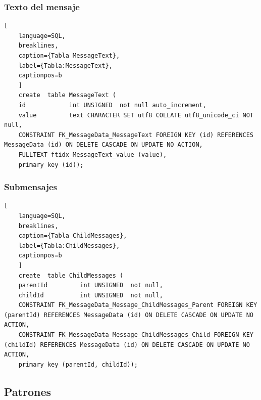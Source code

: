 \subsubsection{Texto del mensaje}
\begin{lstlisting}[
    language=SQL,
    breaklines, 
    caption={Tabla MessageText}, 
    label={Tabla:MessageText}, 
    captionpos=b
    ]
    create  table MessageText (
    id            int UNSIGNED  not null auto_increment, 
    value         text CHARACTER SET utf8 COLLATE utf8_unicode_ci NOT null, 
    CONSTRAINT FK_MessageData_MessageText FOREIGN KEY (id) REFERENCES MessageData (id) ON DELETE CASCADE ON UPDATE NO ACTION,
    FULLTEXT ftidx_MessageText_value (value),
    primary key (id));
\end{lstlisting}

\subsubsection{Submensajes}
\begin{lstlisting}[
    language=SQL,
    breaklines, 
    caption={Tabla ChildMessages}, 
    label={Tabla:ChildMessages}, 
    captionpos=b
    ]
    create  table ChildMessages (
    parentId         int UNSIGNED  not null, 
    childId          int UNSIGNED  not null, 
    CONSTRAINT FK_MessageData_Message_ChildMessages_Parent FOREIGN KEY (parentId) REFERENCES MessageData (id) ON DELETE CASCADE ON UPDATE NO ACTION,
    CONSTRAINT FK_MessageData_Message_ChildMessages_Child FOREIGN KEY (childId) REFERENCES MessageData (id) ON DELETE CASCADE ON UPDATE NO ACTION,
    primary key (parentId, childId));
\end{lstlisting}

\subsection{Patrones}

